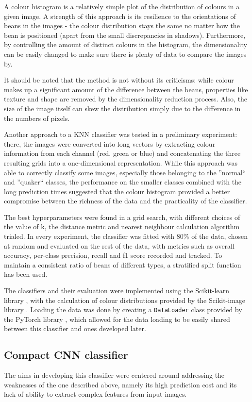 A colour histogram is a relatively simple plot of the distribution of colours in a given image.
A strength of this approach is its resilience to the orientations of beans in the images - the colour distribution stays
the same no matter how the bean is positioned (apart from the small discrepancies in shadows).
Furthermore, by controlling the amount of distinct colours in the histogram, the dimensionality can be easily changed to
make sure there is plenty of data to compare the images by.

It should be noted that the method is not without its criticisms: while colour makes up a significant amount of the difference
between the beans, properties like texture and shape are removed by the dimensionality reduction process.
Also, the size of the image itself can skew the distribution simply due to the difference in the numbers of pixels.

Another approach to a KNN classifier was tested in a preliminary experiment:
there, the images were converted into long vectors by extracting colour information from each channel (red, green or blue)
and concatenating the three resulting grids into a one-dimensional representation.
While this approach was able to correctly classify some images, especially those belonging to the ''normal`` and ''quaker``
classes, the performance on the smaller classes combined with the long prediction times suggested that the colour histogram
provided a better compromise between the richness of the data and the practicality of the classifier.

The best hyperparameters were found in a grid search, with different choices of the value of k, the distance metric
and nearest neighbour calculation algorithm trialed.
In every experiment, the classifier was fitted with 80\% of the data, chosen at random and evaluated on the rest of the data,
with metrics such as overall accuracy, per-class precision, recall and f1 score recorded and tracked.
To maintain a consistent ratio of beans of different types, a stratified split function has been used.

The classifiers and their evaluation were implemented using the Scikit-learn library \cite{sklearnLibrary}, with the calculation of colour
distributions provided by the Scikit-image library \cite{skImageLibrary}.
Loading the data was done by creating a \verb|DataLoader| class provided by the PyTorch library \cite{pytorchLibrary}, which allowed
for the data loading to be easily shared between this classifier and ones developed later.
\subsection{Compact CNN classifier}
\label{subsec:deep-learning}
The aims in developing this classifier were centered around addressing the weaknesses of the one described above,
namely its high prediction cost and its lack of ability to extract complex features from input images.

